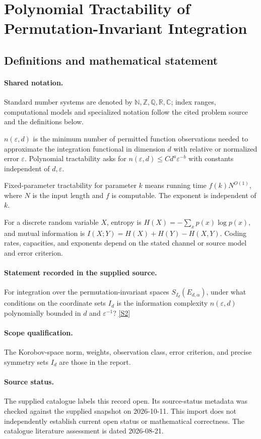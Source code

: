 \documentclass[11pt]{article}
\newcommand{\sref}[2]{\hyperlink{source:#1:#2}{[S#2]}}
\begin{document}
\section{Polynomial Tractability of Permutation-Invariant Integration}\label{statement}

\subsection{Definitions and mathematical statement}

\paragraph{Shared notation.}Standard number systems are denoted by $\mathbb N,\mathbb Z,\mathbb Q,\mathbb R,\mathbb C$; index ranges, computational models and specialized notation follow the cited problem source and the definitions below.


$n(\varepsilon,d)$ is the minimum number of permitted function observations needed to approximate the integration functional in dimension $d$ with relative or normalized error $\varepsilon$. Polynomial tractability asks for $n(\varepsilon,d)\leq C d^a\varepsilon^{-b}$ with constants independent of $d,\varepsilon$.

Fixed-parameter tractability for parameter $k$ means running time $f(k)N^{O(1)}$, where $N$ is the input length and $f$ is computable. The exponent is independent of $k$.

For a discrete random variable $X$, entropy is $H(X)=-\sum_xp(x)\log p(x)$, and mutual information is $I(X;Y)=H(X)+H(Y)-H(X,Y)$. Coding rates, capacities, and exponents depend on the stated channel or source model and error criterion.
\paragraph{Statement recorded in the supplied source.}
For integration over the permutation-invariant spaces $S_{I_d}(E_{d,\alpha})$, under what conditions on the coordinate sets $I_d$ is the information complexity $n(\varepsilon,d)$ polynomially bounded in $d$ and $\varepsilon^{-1}$? \sref{statement}{2}
\paragraph{Scope qualification.}
The Korobov-space norm, weights, observation class, error criterion, and precise symmetry sets $I_d$ are those in the report.
\paragraph{Source status.}
The supplied catalogue labels this record open. Its source-status metadata was checked against the supplied snapshot on 2026-10-11. This import does not independently establish current open status or mathematical correctness. The catalogue literature assessment is dated 2026-08-21.
\end{document}
